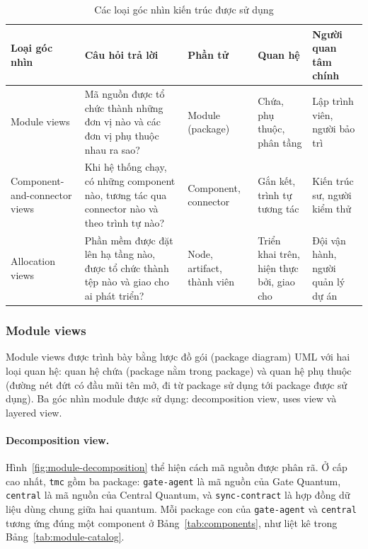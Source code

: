 \begin{table}[H]
\centering
\caption{Các loại góc nhìn kiến trúc được sử dụng}\label{tab:view-types}
\small
\renewcommand{\arraystretch}{1.3}
\begin{tabularx}{\textwidth}{|>{\raggedright\arraybackslash}p{2.6cm}|>{\raggedright\arraybackslash}X|>{\raggedright\arraybackslash}p{2.8cm}|>{\raggedright\arraybackslash}p{3.0cm}|>{\raggedright\arraybackslash}p{2.6cm}|}
\hline
\textbf{Loại góc nhìn} & \textbf{Câu hỏi trả lời} & \textbf{Phần tử} & \textbf{Quan hệ} & \textbf{Người quan tâm chính} \\
\hline
Module views & Mã nguồn được tổ chức thành những đơn vị nào và các đơn vị phụ thuộc nhau ra sao? & Module (package) & Chứa, phụ thuộc, phân tầng & Lập trình viên, người bảo trì \\
\hline
Component-and-connector views & Khi hệ thống chạy, có những component nào, tương tác qua connector nào và theo trình tự nào? & Component, connector & Gắn kết, trình tự tương tác & Kiến trúc sư, người kiểm thử \\
\hline
Allocation views & Phần mềm được đặt lên hạ tầng nào, được tổ chức thành tệp nào và giao cho ai phát triển? & Node, artifact, thành viên & Triển khai trên, hiện thực bởi, giao cho & Đội vận hành, người quản lý dự án \\
\hline
\end{tabularx}
\end{table}

\subsubsection{Module views}\label{sec:module-views}
Module views được trình bày bằng lược đồ gói (package diagram) UML với hai loại quan hệ: quan hệ chứa (package nằm trong package) và quan hệ phụ thuộc (đường nét đứt có đầu mũi tên mở, đi từ package sử dụng tới package được sử dụng). Ba góc nhìn module được sử dụng: decomposition view, uses view và layered view.

\paragraph{Decomposition view.} Hình~\ref{fig:module-decomposition} thể hiện cách mã nguồn được phân rã. Ở cấp cao nhất, \texttt{tmc} gồm ba package: \texttt{gate-agent} là mã nguồn của Gate Quantum, \texttt{central} là mã nguồn của Central Quantum, và \texttt{sync-contract} là hợp đồng dữ liệu dùng chung giữa hai quantum. Mỗi package con của \texttt{gate-agent} và \texttt{central} tương ứng đúng một component ở Bảng~\ref{tab:components}, như liệt kê trong Bảng~\ref{tab:module-catalog}.

